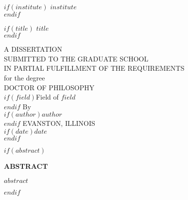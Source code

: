 \doublespacing

\newcommand{\formattitlespace}{0.6in}

\begin{titlepage}\begin{center}\begin{singlespacing}
\vspace{5\baselineskip}   
$if(institute)$
\MakeUppercase{$institute$}\\
$endif$
\vspace{\formattitlespace}

$if(title)$
$title$\\
$endif$
\vspace{\formattitlespace}

A DISSERTATION\\
\vspace{\formattitlespace}
SUBMITTED TO THE GRADUATE SCHOOL\\
IN PARTIAL FULFILLMENT OF THE REQUIREMENTS\\
\vspace{\formattitlespace}
for the degree\\
\vspace{\formattitlespace}
DOCTOR OF PHILOSOPHY\\
\vspace{\formattitlespace}
$if(field)$Field of $field$\\$endif$
\vspace{\formattitlespace}
By\\
\vspace{1\baselineskip}
$if(author)$$author$\\$endif$
\vspace{\formattitlespace}
EVANSTON, ILLINOIS\\
\vspace{\formattitlespace}
$if(date)$$date$\\$endif$
\vspace{\formattitlespace}
\vfill

\end{singlespacing}\end{center}\end{titlepage}

\setcounter{page}{2}
$if(abstract)$
\clearpage
\begin{centering}
\textbf{ABSTRACT}\\
\vspace{\baselineskip}
\end{centering}
\begin{doublespacing}
$abstract$
\end{doublespacing}
$endif$



